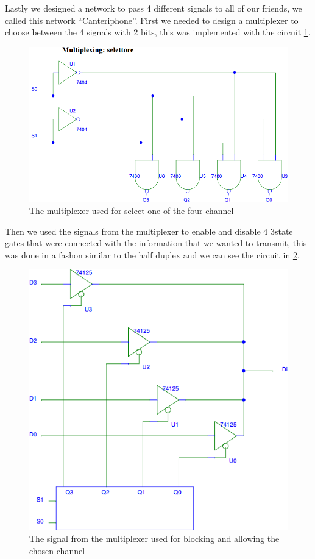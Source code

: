 Lastly we designed a network to pass 4 different signals to all of our friends, we called this network  ``Canteriphone''. First we needed to design a multiplexer to choose between the 4 signals with 2 bits, this was implemented with the circuit \ref{multi_select}.
\begin{figure}[H]
\centering
\includegraphics[width=.7\textwidth]{10/multi_select.png}
\caption{The multiplexer used for select one of the four channel}\label{multi_select}
\end{figure}

Then we used the signals from the multiplexer to enable and disable 4 3state gates that were connected with the information that we wanted to transmit, this was done in a fashon similar to the half duplex and we can see the circuit in \ref{multi_wired}.
\begin{figure}[H]
\centering
\includegraphics[width=.7\textwidth]{10/multi_wired.png}
\caption{The signal from the multiplexer used for blocking and allowing the chosen channel}\label{multi_wired}
\end{figure}

